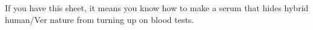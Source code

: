 \documentclass[green]{guildcamp4}
\begin{document}
\name{\gSerum{}}

If you have this sheet, it means you know how to make a serum that hides hybrid human/Ver nature from turning up on blood tests.
\end{document}
